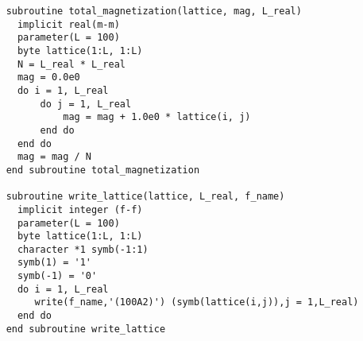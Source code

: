 \begin{verbatim}
    subroutine total_magnetization(lattice, mag, L_real)
      implicit real(m-m)
      parameter(L = 100)
      byte lattice(1:L, 1:L)
      N = L_real * L_real
      mag = 0.0e0
      do i = 1, L_real
          do j = 1, L_real
              mag = mag + 1.0e0 * lattice(i, j)
          end do
      end do
      mag = mag / N 
    end subroutine total_magnetization
      
    subroutine write_lattice(lattice, L_real, f_name)
      implicit integer (f-f)
      parameter(L = 100)
      byte lattice(1:L, 1:L)
      character *1 symb(-1:1)
      symb(1) = '1'
      symb(-1) = '0'
      do i = 1, L_real
         write(f_name,'(100A2)') (symb(lattice(i,j)),j = 1,L_real)
      end do  
    end subroutine write_lattice
\end{verbatim}

